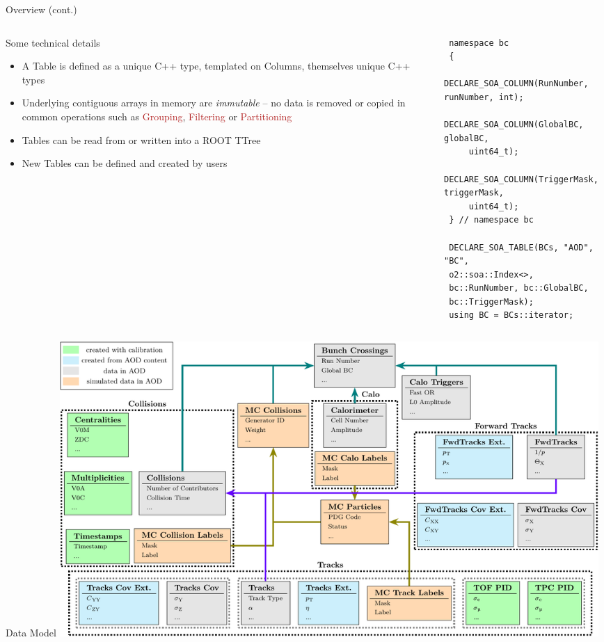 \documentclass[10pt,lualatex,xcolor={table,svgnames},{hyperref={bookmarks=true,linktoc=all}},aspectratio=169]{beamer}
\newcommand{\programmatic}[1]{\textcolor{-green!40!yellow}{#1}}
\newcommand{\operation}[1]{\textcolor{FireBrick}{#1}}
\begin{document}
\begin{frame}[fragile,shrink=5]{Overview (cont.)}
    \vspace{2ex}
	\begin{columns}
    \begin{column}{0.4\textwidth}
        \begin{block}{Some technical details}
            \begin{itemize}
                \item A \programmatic{Table} is defined as a unique C++ type, templated on \programmatic{Columns}, themselves unique C++ types
                \item Underlying contiguous arrays in memory are \emph{immutable} -- no data is removed or copied in common operations such as \operation{Grouping}, \operation{Filtering} or \operation{Partitioning}
                \item \programmatic{Tables} can be read from or written into a ROOT TTree
                \item New \programmatic{Tables} can be defined and created by users
            \end{itemize}
        \end{block}
    \end{column}
    \begin{column}{0.55\textwidth}
        \begin{verbatim}
 namespace bc
 {
     DECLARE_SOA_COLUMN(RunNumber, runNumber, int);
     DECLARE_SOA_COLUMN(GlobalBC, globalBC,
     uint64_t);
     DECLARE_SOA_COLUMN(TriggerMask, triggerMask,
     uint64_t);
 } // namespace bc

 DECLARE_SOA_TABLE(BCs, "AOD", "BC",
 o2::soa::Index<>,
 bc::RunNumber, bc::GlobalBC,
 bc::TriggerMask);
 using BC = BCs::iterator;
        \end{verbatim}
    \end{column}
\end{columns}
\end{frame}

\begin{frame}{Data Model}
     \vspace{-1ex}%
     \centering\includegraphics[width=0.9\textwidth]{figures/aod-data-model.pdf}
\end{frame}
\end{document}
